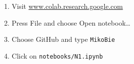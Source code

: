 \documentclass{beamer}
\begin{document}
\begin{frame}[fragile]
{\begin{enumerate}
            \item Visit \textcolor{blue}{\href{https://colab.research.google.com/notebooks/welcome.ipynb}{www.colab.research.google.com}}
            \item Press File and choose Open notebook\dots
            \item Choose GitHub and type \texttt{MikoBie}
            \item Click on \texttt{notebooks/N1.ipynb}
        \end{enumerate}
    }
\end{frame}
\end{document}
